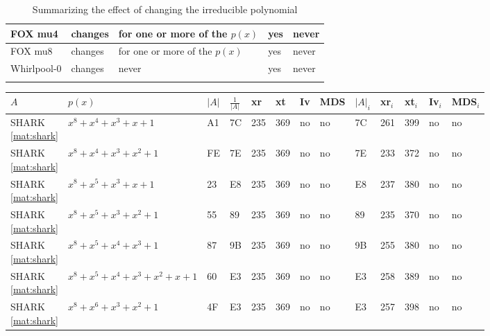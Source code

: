 \begin{footnotesize}
\begin{longtable}{|l|l|l|l|l|}
FOX mu4                    & changes              & for one or more of the $p(x)$             & yes                      & never               \\ \hline
FOX mu8                    & changes              & for one or more of the $p(x)$             & yes                      & never               \\ \hline
Whirlpool-0                & changes              & never                 & yes                      & never               \\ \hline
\caption{Summarizing the effect of changing the irreducible polynomial}
\label{tbl:poly-summary}\\
\end{longtable}
\end{footnotesize}

\begin{tiny}
\begin{longtable}{|l|l|l|l|l|l|l|l|l|l|l|l|l|}
\hline
$A$ & $p(x)$ & $|A|$ & $\frac{1}{|A|}$ & xr & xt & Iv & MDS & $|A|_i$ & xr$_i$ & xt$_i$ & Iv$_i$ & MDS$_i$ \\ \hline
%
\endhead
%
\shortstack{SHARK \\ \eqref{mat:shark}} & $x^8 + x^4 + x^3 + x + 1$ & A1 & 7C & 235 & 369 & no & no & 7C & 261 & 399 & no & no \\ \hline
\shortstack{SHARK \\ \eqref{mat:shark}} & $x^8 + x^4 + x^3 + x^2 + 1$ & FE & 7E & 235 & 369 & no & no & 7E & 233 & 372 & no & no \\ \hline
\shortstack{SHARK \\ \eqref{mat:shark}} & $x^8 + x^5 + x^3 + x + 1$ & 23 & E8 & 235 & 369 & no & no & E8 & 237 & 380 & no & no \\ \hline
\shortstack{SHARK \\ \eqref{mat:shark}} & $x^8 + x^5 + x^3 + x^2 + 1$ & 55 & 89 & 235 & 369 & no & no & 89 & 235 & 370 & no & no \\ \hline
\shortstack{SHARK \\ \eqref{mat:shark}} & $x^8 + x^5 + x^4 + x^3 + 1$ & 87 & 9B & 235 & 369 & no & no & 9B & 255 & 380 & no & no \\ \hline
\shortstack{SHARK \\ \eqref{mat:shark}} & $x^8 + x^5 + x^4 + x^3 + x^2 + x + 1$ & 60 & E3 & 235 & 369 & no & no & E3 & 258 & 389 & no & no \\ \hline
\shortstack{SHARK \\ \eqref{mat:shark}} & $x^8 + x^6 + x^3 + x^2 + 1$ & 4F & E3 & 235 & 369 & no & no & E3 & 257 & 398 & no & no \\ \hline

\end{longtable}
\end{tiny}
